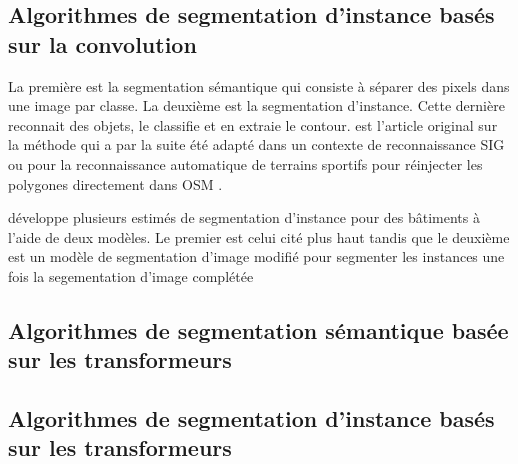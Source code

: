   \subsection{Algorithmes de segmentation d'instance basés sur la convolution}
  La première est la segmentation sémantique qui consiste à séparer des pixels dans une image par classe. La deuxième est la segmentation d'instance. Cette dernière reconnait des objets, le classifie et en extraie le contour. \textcite{He:MaskRCNN:2018} est l'article original sur la méthode qui a par la suite été adapté dans un contexte de reconnaissance SIG \parencite{Pesek:MaskRCNN:2018} ou pour la reconnaissance automatique de terrains sportifs pour réinjecter les polygones directement dans \ac{OSM} \parencite{Remillard:JremillardImagestoosm:2024}.\par
  \textcite{Fritz:InstanceSegmentation:2020} développe plusieurs estimés de segmentation d'instance pour des bâtiments à l'aide de deux modèles. Le premier est celui cité plus haut\parencite{He:MaskRCNN:2018} tandis que le deuxième est un modèle de segmentation d'image modifié pour segmenter les instances \parencite{Iglovikov:TernausNetV2Fully:2018} une fois la segementation d'image complétée
  \subsection{Algorithmes de segmentation sémantique basée sur les transformeurs}
  \subsection{Algorithmes de segmentation d'instance basés sur les transformeurs}
